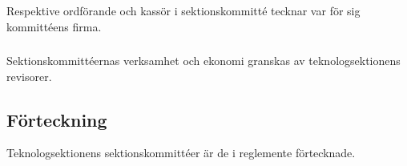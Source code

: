 \subsubsection{}
Respektive ordförande och kassör i sektionskommitté tecknar var för
sig kommittéens firma.

\subsubsection{}
Sektionskommittéernas verksamhet och ekonomi granskas av
teknologsektionens revisorer.

\subsection{Förteckning}
Teknologsektionens sektionskommittéer är de i reglemente förtecknade.
